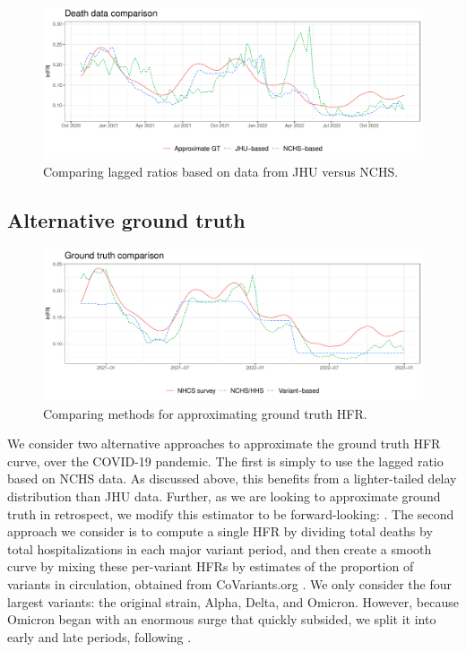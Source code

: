 \documentclass{article}
\renewcommand{\hat}{\widehat} %
\begin{document}
\begin{figure}[h]
\centering
\includegraphics[width=\linewidth]{Figures/Real/jhu_vs_nchs.pdf}
\caption{Comparing lagged ratios based on data from JHU versus NCHS.}
\label{fig:jhu_vs_nchs}
\end{figure}

\subsection{Alternative ground truth}
\label{apx:alt_gt}

\begin{figure}[b!]
\centering
\includegraphics[width=\linewidth]{Figures/Real/ApproxGT.pdf}
\caption{Comparing methods for approximating ground truth HFR.}
\label{fig:approxGT}
\end{figure}

We consider two alternative approaches to approximate the ground truth HFR
curve, over the COVID-19 pandemic. The first is simply to use the lagged ratio
based on NCHS data. As discussed above, this benefits from a lighter-tailed
delay distribution than JHU data. Further, as we are looking to approximate
ground truth in retrospect, we modify this estimator to be forward-looking:
\smash{$\hat{p}_t^\ell = Y_{t+\ell} / X_t$}. The second approach we consider is
to compute a single HFR by dividing total deaths by total hospitalizations in
each major variant period,  
and then create a smooth curve by mixing these per-variant HFRs by estimates
of the proportion of variants in circulation, obtained from CoVariants.org
\citep{Hodcroft2021}. We only consider the four largest variants: the original
strain, Alpha, Delta, and Omicron. However, because Omicron began with an
enormous surge that quickly subsided, we split it into early and late periods,
following \citep{adjei2022mortality}.     
\end{document}
